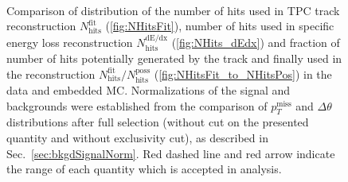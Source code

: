 \begin{figure}[hb]
{\begin{subfigure}[b]{\linewidth}
  \end{subfigure}\\
  \begin{minipage}[t][1.042\linewidth][t]{\linewidth}\vspace{10pt}
    \caption[Comparison of distribution of $N_{\text{hits}}^{\text{fit}}$,~$N_{\text{hits}}^{\text{dE/dx}}$ and $N_{\text{hits}}^{\text{fit}}/N_{\text{hits}}^{\text{poss}}$ in the data and embedded MC]
    {Comparison of distribution of the number of hits used in TPC track reconstruction $N_{\text{hits}}^{\text{fit}}$ (\ref{fig:NHitsFit}), number of hits used in specific energy loss reconstruction $N_{\text{hits}}^{\text{dE/dx}}$ (\ref{fig:NHits_dEdx}) and fraction of number of hits potentially generated by the track and finally used in the reconstruction $N_{\text{hits}}^{\text{fit}}/N_{\text{hits}}^{\text{poss}}$ (\ref{fig:NHitsFit_to_NHitsPos}) in the data and embedded MC. Normalizations of the signal and backgrounds were established from the comparison of $p_{T}^{\text{miss}}$ and $\Delta\theta$ distributions after full selection (without cut on the presented quantity and without exclusivity cut), as described in Sec.~\ref{sec:bkgdSignalNorm}. Red dashed line and red arrow indicate the range of each quantity which is accepted in analysis.}\label{fig:NHits}
  \end{minipage}
}%

\end{figure}







